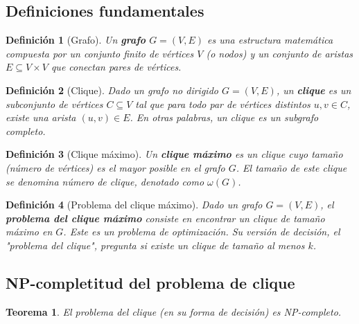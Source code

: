 \documentclass[12pt,a4paper]{report}
\newtheorem{definicion}{Definición}[chapter]
\newtheorem{teorema}{Teorema}[chapter]
\begin{document}
\subsection{Definiciones fundamentales}
\begin{definicion}[Grafo]
Un \textbf{grafo} $G = (V, E)$ es una estructura matemática compuesta por un conjunto finito de vértices $V$ (o nodos) y un conjunto de aristas $E \subseteq V \times V$ que conectan pares de vértices.
\end{definicion}

\begin{definicion}[Clique]
Dado un grafo no dirigido $G = (V, E)$, un \textbf{clique} es un subconjunto de vértices $C \subseteq V$ tal que para todo par de vértices distintos $u, v \in C$, existe una arista $(u, v) \in E$. En otras palabras, un clique es un subgrafo completo.
\end{definicion}

\begin{definicion}[Clique máximo]
Un \textbf{clique máximo} es un clique cuyo tamaño (número de vértices) es el mayor posible en el grafo $G$. El tamaño de este clique se denomina número de clique, denotado como $\omega(G)$.
\end{definicion}

\begin{definicion}[Problema del clique máximo]
Dado un grafo $G = (V, E)$, el \textbf{problema del clique máximo} consiste en encontrar un clique de tamaño máximo en $G$. Este es un problema de optimización. Su versión de decisión, el "problema del clique", pregunta si existe un clique de tamaño al menos $k$.
\end{definicion}

\subsection{NP-completitud del problema de clique}
\begin{teorema}
El problema del clique (en su forma de decisión) es NP-completo.
\end{teorema}
\end{document}
